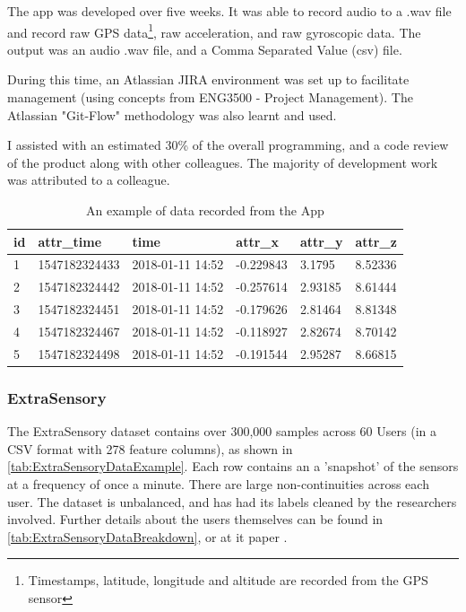 \documentclass{UoNMCHA}
\numberwithin{equation}{section}
\begin{document}
The app was developed over five weeks. It was able to record audio to a .wav file and record raw GPS data\footnote{Timestamps, latitude, longitude and altitude are recorded from the GPS sensor}, raw acceleration, and raw gyroscopic data. The output was an audio .wav file, and a Comma Separated Value (csv) file.

During this time, an Atlassian JIRA environment was set up to facilitate management (using concepts from ENG3500 - Project Management). The Atlassian "Git-Flow" methodology was also learnt and used.

I assisted with an estimated 30\% of the overall programming, and a code review of the product along with other colleagues. The majority of development work was attributed to a colleague.





    \begin{table} 
        \begin{center}
            \caption{An example of data recorded from the App}\label{tab:ProjectData}
            \begin{tabular}{llllll}
            \hline\hline id & attr\_time & time & attr\_x   & attr\_y & attr\_z \\ \hline
            1  & 1547182324433 & 2018-01-11 14:52 & -0.229843 & 3.1795  & 8.52336 \\
            2  & 1547182324442 & 2018-01-11 14:52 & -0.257614 & 2.93185 & 8.61444 \\
            3  & 1547182324451 & 2018-01-11 14:52 & -0.179626 & 2.81464 & 8.81348 \\
            4  & 1547182324467 & 2018-01-11 14:52 & -0.118927 & 2.82674 & 8.70142 \\
            5  & 1547182324498 & 2018-01-11 14:52 & -0.191544 & 2.95287 & 8.66815 \\ \hline
            \end{tabular}
        \end{center}
    \end{table}

\subsubsection{ExtraSensory}
The ExtraSensory dataset contains over 300,000 samples across 60 Users (in a CSV format with 278 feature columns), as shown in \ref{tab:ExtraSensoryDataExample}. Each row contains an a 'snapshot' of the sensors at a frequency of once a minute. There are large non-continuities across each user. The dataset is unbalanced, and has had its labels cleaned by the researchers involved. Further details about the users themselves can be found in \ref{tab:ExtraSensoryDataBreakdown}, or at it paper \cite{Vaizman2017}.
\end{document}
